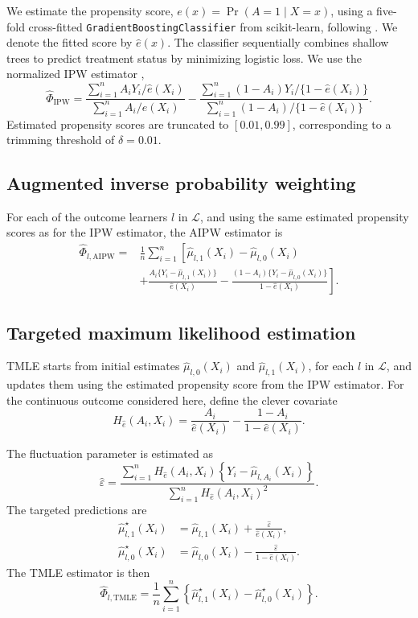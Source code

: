 \begin{landscape}
We estimate the propensity score, \mbox{\(e(x)=\Pr(A=1\mid X=x)\)}, using a five-fold cross-fitted \texttt{GradientBoostingClassifier} from scikit-learn, following . We denote the fitted score by \(\widehat e(x)\). The classifier sequentially combines shallow trees to predict treatment status by minimizing logistic loss. We use the normalized IPW estimator \cite{luncefordStratificationWeightingPropensity2004},
\[
\widehat{\Phi}_{\mathrm{IPW}}
=
\frac{
\sum_{i=1}^{n}
A_iY_i/\widehat e(X_i)
}{
\sum_{i=1}^{n}
A_i/\widehat e(X_i)
}
-
\frac{
\sum_{i=1}^{n}
(1-A_i)Y_i/\{1-\widehat e(X_i)\}
}{
\sum_{i=1}^{n}
(1-A_i)/\{1-\widehat e(X_i)\}
}.
\]
Estimated propensity scores are truncated to \([0.01,0.99]\), corresponding to a trimming threshold of \(\delta=0.01\).

\subsection{Augmented inverse probability weighting}

For each of the outcome learners \(l\) in \(\mathcal L\), and using the same estimated propensity scores as for the IPW estimator, the AIPW estimator \cite{bangDoublyRobustEstimation2005} is
\[
\begin{aligned}
\widehat{\Phi}_{l,\mathrm{AIPW}}
={}&
\frac{1}{n}
\sum_{i=1}^{n}
\left[
\widehat{\mu}_{l,1}(X_i)
-
\widehat{\mu}_{l,0}(X_i)
\right.\\
&\left.
+
\frac{
A_i\{Y_i-\widehat{\mu}_{l,1}(X_i)\}
}{
\widehat e(X_i)
}
-
\frac{
(1-A_i)\{Y_i-\widehat{\mu}_{l,0}(X_i)\}
}{
1-\widehat e(X_i)
}
\right].
\end{aligned}
\]

\subsection{Targeted maximum likelihood estimation}

TMLE \cite{vanderlaanTargetedMaximumLikelihood2006} starts from initial estimates \(\widehat{\mu}_{l,0}(X_i)\) and \(\widehat{\mu}_{l,1}(X_i)\), for each \(l\) in \(\mathcal L\), and updates them using the estimated propensity score from the IPW estimator. For the continuous outcome considered here, define the clever covariate
\[
H_{\widehat e}(A_i,X_i)
=
\frac{A_i}{\widehat e(X_i)}
-
\frac{1-A_i}{1-\widehat e(X_i)}.
\]

The fluctuation parameter is estimated as
\[
\widehat{\varepsilon}
=
\frac{
\sum_{i=1}^{n}
H_{\widehat e}(A_i,X_i)
\left\{
Y_i-\widehat{\mu}_{l,A_i}(X_i)
\right\}
}{
\sum_{i=1}^{n}
H_{\widehat e}(A_i,X_i)^2
}.
\]
The targeted predictions are
\[
\begin{aligned}
\widehat{\mu}^{\star}_{l,1}(X_i)
&=\widehat{\mu}_{l,1}(X_i)+\frac{\widehat{\varepsilon}}{\widehat e(X_i)},\\
\widehat{\mu}^{\star}_{l,0}(X_i)
&=\widehat{\mu}_{l,0}(X_i)-\frac{\widehat{\varepsilon}}{1-\widehat e(X_i)}.
\end{aligned}
\]
The TMLE estimator is then
\[
\widehat{\Phi}_{l,\mathrm{TMLE}}
=
\frac{1}{n}
\sum_{i=1}^{n}
\left\{
\widehat{\mu}^{\star}_{l,1}(X_i)
-
\widehat{\mu}^{\star}_{l,0}(X_i)
\right\}.
\]


\end{landscape}
